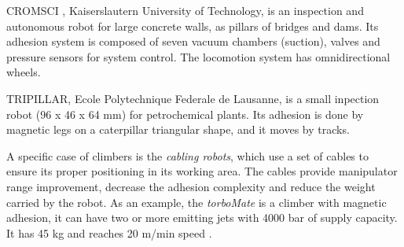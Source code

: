 
CROMSCI%
, Kaiserslautern University of Technology, is an
inspection and autonomous robot for large concrete walls, as
pillars of bridges and dams. Its adhesion system is composed of seven vacuum
chambers (suction), valves and pressure sensors for system control. The
locomotion system has omnidirectional wheels.



TRIPILLAR, Ecole Polytechnique Federale de Lausanne, is a small inpection robot
(96 x 46 x 64 mm) for petrochemical plants. Its adhesion is done by magnetic
legs on a caterpillar triangular shape, and it moves by tracks.

A specific case of climbers is the \textit{cabling robots}, which use a set
of cables to ensure its proper positioning in its working area. The cables provide
manipulator range improvement, decrease the adhesion complexity and reduce the
weight carried by the robot. As an example, the \textit{torboMate} is a climber
with magnetic adhesion, it can have two or more emitting jets with 4000 bar of
supply capacity. It has 45 kg and reaches 20 m/min speed \citep{torbo}.

